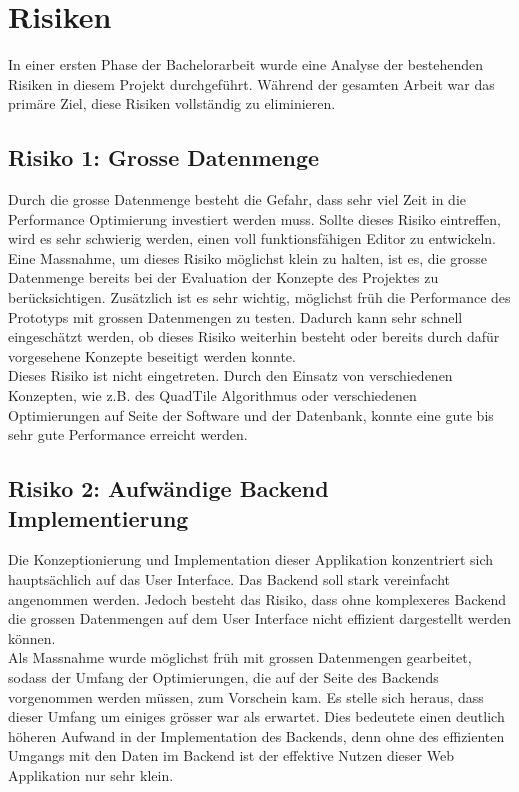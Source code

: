 \section{Risiken}
In einer ersten Phase der Bachelorarbeit wurde eine Analyse der bestehenden Risiken in diesem Projekt durchgeführt. Während der gesamten Arbeit war das primäre Ziel, diese Risiken vollständig zu eliminieren.
\subsection*{Risiko 1: Grosse Datenmenge}
Durch die grosse Datenmenge besteht die Gefahr, dass sehr viel Zeit in die Performance Optimierung investiert werden muss. Sollte dieses Risiko eintreffen, wird es sehr schwierig werden, einen voll funktionsfähigen Editor zu entwickeln.\\
Eine Massnahme, um dieses Risiko möglichst klein zu halten, ist es, die grosse Datenmenge bereits bei der Evaluation der Konzepte des Projektes zu berücksichtigen. Zusätzlich ist es sehr wichtig, möglichst früh die Performance des Prototyps mit grossen Datenmengen zu testen. Dadurch kann sehr schnell eingeschätzt werden, ob dieses Risiko weiterhin besteht oder bereits durch dafür vorgesehene Konzepte beseitigt werden konnte.\\
Dieses Risiko ist nicht eingetreten. Durch den Einsatz von verschiedenen Konzepten, wie z.B. des QuadTile Algorithmus \cite{OSMQuadTiles} oder verschiedenen Optimierungen auf Seite der Software und der Datenbank, konnte eine gute bis sehr gute Performance erreicht werden.
\subsection*{Risiko 2: Aufwändige Backend Implementierung}
Die Konzeptionierung und Implementation dieser Applikation konzentriert sich hauptsächlich auf das User Interface. Das Backend soll stark vereinfacht angenommen werden. Jedoch besteht das Risiko, dass ohne komplexeres Backend die grossen Datenmengen auf dem User Interface nicht effizient dargestellt werden können.\\
Als Massnahme wurde möglichst früh mit grossen Datenmengen gearbeitet, sodass der Umfang der Optimierungen, die auf der Seite des Backends vorgenommen werden müssen, zum Vorschein kam. Es stelle sich heraus, dass dieser Umfang  um einiges grösser war als erwartet. Dies bedeutete einen deutlich höheren Aufwand in der Implementation des Backends, denn ohne des effizienten Umgangs mit den Daten im Backend ist der effektive Nutzen dieser Web Applikation nur sehr klein.